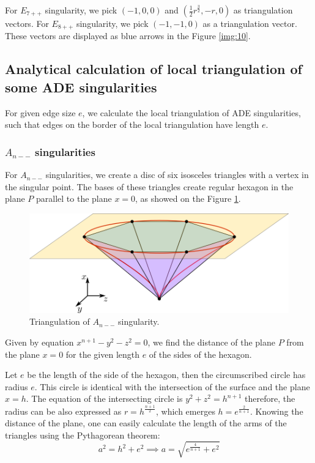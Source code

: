 For $E_{7++}$ singularity, we pick $(-1, 0, 0)$ and 
$(\frac{1}{2}r^{\frac{3}{2}}, -r, 0)$ as triangulation vectors.
For $E_{8++}$ singularity, we pick $(-1, -1, 0)$ as a triangulation vector.
These vectors are displayed as blue arrows in the Figure \ref{img:10}.

\subsection{Analytical calculation of local triangulation of some ADE singularities}
For given edge size $e$, we calculate the local triangulation of ADE
singularities, such that edges on the border of the local triangulation
have length $e$.
\subsubsection*{$A_{n--}$ singularities}
For $A_{n--}$ singularities, we create a disc of six isosceles triangles
with a vertex in the singular point. The bases of these triangles create regular
hexagon in the plane $P$ parallel to the plane $x=0$, as showed on the Figure
\ref{img:11}.
\begin{figure}
    \centerline{\includegraphics[scale=0.5]{images/img11}}
    \caption[Triangulation of $A_{n--}$ singularity.]
    {Triangulation of $A_{n--}$ singularity.}
    \label{img:11}
\end{figure}
Given by equation $x^{n+1}-y^2-z^2=0$, we find the distance of the 
plane $P$ from the plane $x=0$ for the given length $e$ of the sides of
the hexagon.

Let $e$ be the length of the side of the hexagon, then the circumscribed
circle has radius $e$. This circle is identical with the intersection of
the surface and the plane $x=h$. The equation of the intersecting circle
is $y^2+z^2=h^{n+1}$ therefore, the radius can be also expressed as 
$r=h^{\frac{n+1}{2}}$, which emerges $h=e^{\frac{2}{n+1}}$. Knowing the
distance of the plane, one can easily calculate the length of the arms of
the triangles using the Pythagorean theorem: 
$$a^2=h^2+e^2 \implies a = \sqrt{e^{\frac{4}{n+1}} + e^2}$$


